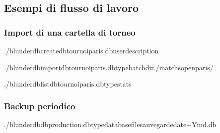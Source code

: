 \documentclass[letterpaper,10pt,italian]{sphinxmanual}
\begin{document}
\subsection{Esempi di flusso di lavoro}
\label{\detokenize{cli:exemples-de-flux-de-travail}}

\subsubsection{Import di una cartella di torneo}
\label{\detokenize{cli:import-d-un-repertoire-de-tournoi}}
\begin{sphinxVerbatim}[commandchars=\\\{\}]
./blunderdbcreate\PYGZhy{}\PYGZhy{}dbtournoi\PYGZus{}paris.db\PYGZhy{}\PYGZhy{}user\PYGZhy{}\PYGZhy{}description

./blunderdbimport\PYGZhy{}\PYGZhy{}dbtournoi\PYGZus{}paris.db\PYGZhy{}\PYGZhy{}typebatch\PYGZhy{}\PYGZhy{}dir./matchs\PYGZus{}open\PYGZus{}paris/

./blunderdblist\PYGZhy{}\PYGZhy{}dbtournoi\PYGZus{}paris.db\PYGZhy{}\PYGZhy{}typestats
\end{sphinxVerbatim}


\subsubsection{Backup periodico}
\label{\detokenize{cli:sauvegarde-reguliere}}
\begin{sphinxVerbatim}[commandchars=\\\{\}]
./blunderdb\PYGZhy{}\PYGZhy{}dbproduction.db\PYGZhy{}\PYGZhy{}typedatabase\PYGZhy{}\PYGZhy{}filesauvegarde\PYGZhy{}date+\PYGZpc{}Y\PYGZpc{}m\PYGZpc{}d.db
\end{sphinxVerbatim}
\end{document}
